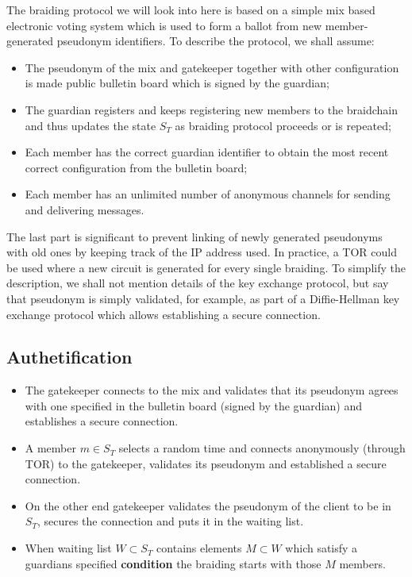 \documentclass[12pt]{article}
\begin{document}
The braiding protocol we will look into here is based on a simple mix based electronic voting system which is used to form a ballot from new member-generated pseudonym identifiers. To describe the protocol, we shall assume:
\begin{itemize}
\item The pseudonym of the mix and gatekeeper together with other configuration is made public bulletin board which is signed by the guardian;
\item The guardian registers and keeps registering new members to the braidchain and thus updates the state $S_T$ as braiding protocol proceeds or is repeated;
\item Each member has the correct guardian identifier to obtain the most recent correct configuration from the bulletin board;
\item Each member has an unlimited number of anonymous channels for sending and delivering messages. 
\end{itemize}
The last part is significant to prevent linking of newly generated pseudonyms with old ones by keeping track of the IP address used. In practice, a TOR could be used where a new circuit is generated for every single braiding. To simplify the description, we shall not mention details of the key exchange protocol, but say that pseudonym is simply validated, for example, as part of a Diffie-Hellman key exchange protocol which allows establishing a secure connection.

\subsection*{Authetification}

\begin{itemize}
\item The gatekeeper connects to the mix and validates that its pseudonym agrees with one specified in the bulletin board (signed by the guardian) and establishes a secure connection. 
\item A member $m \in S_T$ selects a random time and connects anonymously (through TOR) to the gatekeeper, validates its pseudonym and established a secure connection.
\item On the other end gatekeeper validates the pseudonym of the client to be in $S_T$, secures the connection and puts it in the waiting list.
\item When waiting list $W \subset S_T$ contains elements $M \subset W$ which satisfy a guardians specified {\bf condition} the braiding starts with those $M$ members.
\end{itemize}
\end{document}
